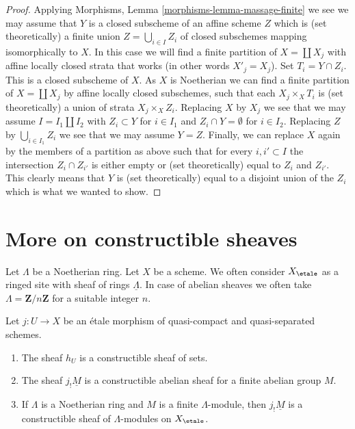 \begin{proof}
\medskip\noindent
Applying Morphisms, Lemma \ref{morphisms-lemma-massage-finite}
we see we may assume that $Y$ is a closed subscheme of an
affine scheme $Z$ which is (set theoretically) a finite union
$Z = \bigcup_{i \in I} Z_i$ of closed subschemes mapping isomorphically
to $X$. In this case we will find a finite partition of $X = \coprod X_j$
with affine locally closed strata that works (in other words $X'_j = X_j$).
Set $T_i = Y \cap Z_i$. This is a closed subscheme of $X$.
As $X$ is Noetherian we can find a finite partition of $X = \coprod X_j$
by affine locally closed subschemes, such that each
$X_j \times_X T_i$ is (set theoretically) a union of strata $X_j \times_X Z_i$.
Replacing $X$ by $X_j$ we see that we may assume $I = I_1 \amalg I_2$
with $Z_i \subset Y$ for $i \in I_1$ and $Z_i \cap Y = \emptyset$ for
$i \in I_2$. Replacing $Z$ by $\bigcup_{i \in I_1} Z_i$ we see that we
may assume $Y = Z$.
Finally, we can replace $X$ again by the members of a partition
as above such that for every $i, i' \subset I$ the intersection
$Z_i \cap Z_{i'}$ is either empty or (set theoretically) equal
to $Z_i$ and $Z_{i'}$. This clearly means that $Y$ is (set theoretically)
equal to a disjoint union of the $Z_i$ which is what we wanted to show.
\end{proof}








\section{More on constructible sheaves}
\label{section-more-constructible}

\noindent
Let $\Lambda$ be a Noetherian ring. Let $X$ be a scheme.
We often consider $X_\etale$ as a ringed site with
sheaf of rings $\underline{\Lambda}$. In case of abelian sheaves
we often take $\Lambda = \mathbf{Z}/n\mathbf{Z}$ for a suitable
integer $n$.

\begin{lemma}
\label{lemma-jshriek-constructible}
Let $j : U \to X$ be an \'etale morphism of quasi-compact and
quasi-separated schemes.
\begin{enumerate}
\item The sheaf $h_U$ is a constructible sheaf of sets.
\item The sheaf $j_!\underline{M}$ is a constructible abelian sheaf
for a finite abelian group $M$.
\item If $\Lambda$ is a Noetherian ring and $M$ is a finite $\Lambda$-module,
then $j_!\underline{M}$ is a constructible sheaf of $\Lambda$-modules
on $X_\etale$.
\end{enumerate}
\end{lemma}


